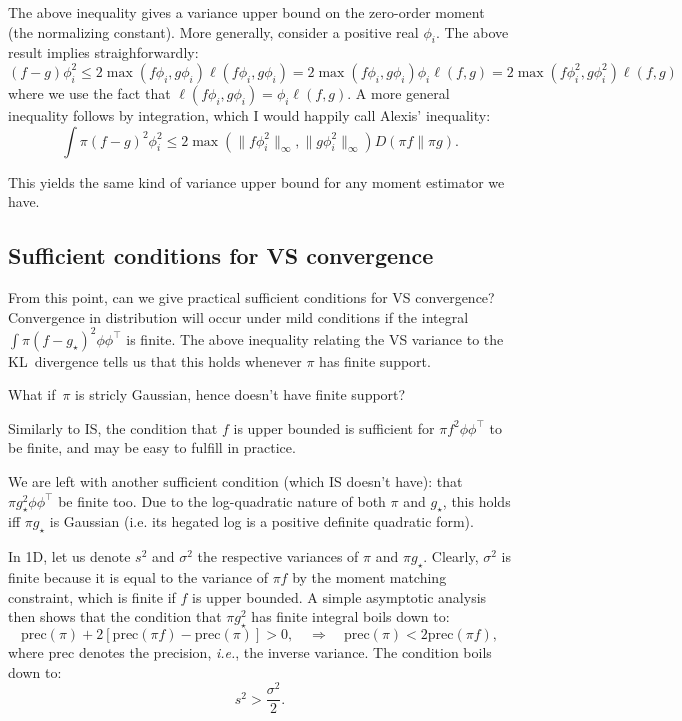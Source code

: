 \documentclass{article}
\def\prec{\mathrm{prec}}
\begin{document}
The above inequality gives a variance upper bound on the zero-order moment (the normalizing constant). More generally, consider a positive real $\phi_i$. The above result implies straighforwardly:
$$
(f-g)\phi_i^2
\leq 2 \max(f\phi_i, g\phi_i) \ell(f\phi_i, g\phi_i)
= 2 \max(f\phi_i, g\phi_i) \phi_i\ell(f, g)
= 2 \max(f\phi_i^2, g\phi_i^2) \ell(f, g)
$$
where we use the fact that $\ell(f\phi_i,g\phi_i)=\phi_i\ell(f,g)$. A more general inequality follows by integration, which I would happily call Alexis' inequality:
$$
\int \pi (f-g)^2\phi_i^2 \leq 2\max(\|f\phi_i^2\|_\infty, \|g\phi_i^2\|_\infty) D(\pi f\|\pi g).
$$

This yields the same kind of variance upper bound for any moment estimator we have.

\subsection{Sufficient conditions for VS convergence}

From this point, can we give practical sufficient conditions for VS convergence?  Convergence in distribution will occur under mild conditions if the integral $\int \pi (f-g_\star)^2\phi\phi^\top$ is finite. The above inequality relating the VS variance to the KL~divergence tells us that this holds whenever $\pi$ has finite support.

What if~$\pi$ is stricly Gaussian, hence doesn't have finite support? 

Similarly to IS, the condition that $f$ is upper bounded is sufficient for $\pi f^2 \phi\phi^\top$ to be finite, and may be easy to fulfill in practice.

We are left with another sufficient condition (which IS doesn't have): that $\pi g_\star^2 \phi\phi^\top$ be finite too. Due to the log-quadratic nature of both $\pi$ and $g_\star$, this holds iff $\pi g_\star$ is Gaussian (i.e. its hegated log is a positive definite quadratic form).

In 1D, let us denote $s^2$ and $\sigma^2$ the respective variances of $\pi$ and $\pi g_\star$. Clearly, $\sigma^2$ is finite because it is equal to the variance of $\pi f$ by the moment matching constraint, which is finite if $f$ is upper bounded. A simple asymptotic analysis then shows that the condition that $\pi g_\star^2$ has finite integral boils down to:
$$
\prec(\pi) + 2 [\prec(\pi f) - \prec(\pi)] > 0,
\quad \Rightarrow \quad
\prec(\pi) < 2 \prec(\pi f),
$$
where $\prec$ denotes the precision, {\em i.e.}, the inverse variance. The condition boils down to:
$$
s^2 > \frac{\sigma^2}{2}.
$$
\end{document}
